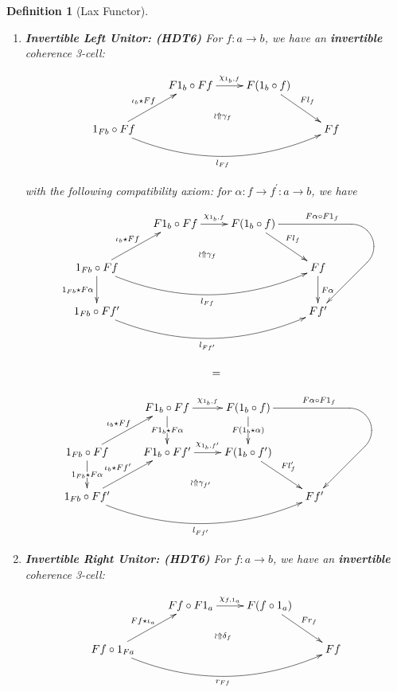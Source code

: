 \documentclass{article}
\numberwithin{equation}{section}
\theoremstyle{definition}
\theoremstyle{plain}
\newtheorem{definition}[equation]{Definition}
\begin{document}
\begin{definition}[Lax Functor]
\begin{enumerate}[label = $\bullet$]
		\item \textbf{Invertible Left Unitor: (HDT6)} For $f: a \to b$, we have an \textbf{invertible} coherence 3-cell:
		
		\[\xymatrix{
			& F1_b \circ Ff \ar[r]^{\chi_{1_b,f}} & F(1_b \circ f) \ar[dr]^{Fl_f}\\
			1_{Fb} \circ Ff \ar[ur]^{\iota_b \star Ff} \ar@/_2pc/[rrr]_{l_{Ff}} \ar@/^1pc/@{{}{ }{}}[rrr]|{\wr \Uparrow \gamma_f} &&& Ff\\
		}\]
		
		with the following compatibility axiom: for $\alpha: f \to f^{\prime}: a \to b$, we have
		
		\[\begin{array}{c}
			\xymatrix{
				& F1_b \circ Ff \ar[r]^{\chi_{1_b,f}} & F(1_b \circ f) \ar[dr]^{Fl_f} \ar`_dl/20pt[ddr]^(0.7){F\alpha\circ F1_f}
				[ddr]\\
				1_{Fb} \circ Ff \ar[d]_{1_{Fb} \star F\alpha} \ar[ur]^{\iota_b \star Ff} \ar@/_2pc/[rrr]_{l_{Ff}} \ar@/^1pc/@{{}{ }{}}[rrr]|{\wr \Uparrow \gamma_f} &&& Ff \ar[d]^{F\alpha}\\
				1_{Fb} \circ Ff^{\prime} \ar@/_2pc/[rrr]_{l_{Ff^{\prime}}} &&& Ff^{\prime}\\
			}\\
			\\
			=\\
			\\
			\xymatrix{
				& F1_b \circ Ff \ar[d]|{F1_b \star F\alpha} \ar[r]^{\chi_{1_b,f}} & F(1_b \circ f) \ar[d]|{F(1_b \star \alpha)} \ar`_dl/20pt[ddr]^(0.7){F\alpha\circ F1_f}
				[ddr]\\
				1_{Fb} \circ Ff \ar[ur]^{\iota_b \star Ff} \ar[d]|{1_{Fb} \star F\alpha} & F1_b \circ Ff^{\prime} \ar[r]^{\chi_{1_b,f^{\prime}}} & F(1_b \circ f^{\prime}) \ar[dr]^{Fl_f^{\prime}}\\
				1_{Fb} \circ Ff^{\prime} \ar[ur]^{\iota_b \star Ff^{\prime}} \ar@/_2pc/[rrr]_{l_{Ff^{\prime}}} \ar@/^1pc/@{{}{ }{}}[rrr]|{\wr \Uparrow \gamma_{f^{\prime}}} &&& Ff^{\prime}\\
			}
		\end{array}\]
		
		\item \textbf{Invertible Right Unitor: (HDT6)} For $f: a \to b$, we have an \textbf{invertible} coherence 3-cell:
		
		\[\xymatrix{
			& Ff \circ F1_a \ar[r]^{\chi_{f,1_a}} & F(f \circ 1_a) \ar[dr]^{Fr_f}\\
			Ff \circ 1_{Fa} \ar[ur]^{Ff \star \iota_a} \ar@/_2pc/[rrr]_{r_{Ff}} \ar@/^1pc/@{{}{ }{}}[rrr]|{\wr \Uparrow \delta_f} &&& Ff\\
		}\]
		

\end{enumerate}
\end{definition}
\end{document}
